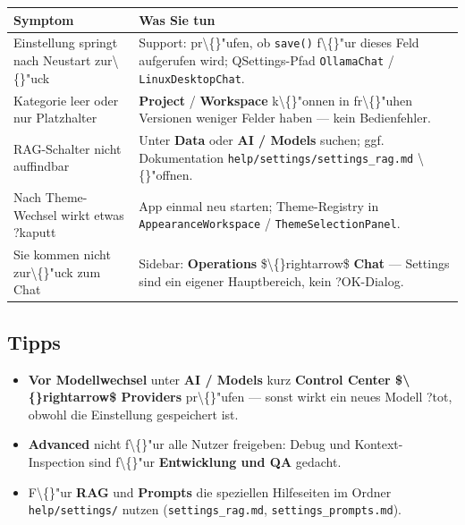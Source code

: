 \begin{center}
\begin{tabular}{ll}
\hline
Symptom & Was Sie tun \\
\hline
Einstellung springt nach Neustart zur\textbackslash\{\}"uck & Support: pr\textbackslash\{\}"ufen, ob \texttt{save()} f\textbackslash\{\}"ur dieses Feld aufgerufen wird; QSettings-Pfad \texttt{OllamaChat} / \texttt{LinuxDesktopChat}. \\
Kategorie leer oder nur Platzhalter & \textbf{Project} / \textbf{Workspace} k\textbackslash\{\}"onnen in fr\textbackslash\{\}"uhen Versionen weniger Felder haben --- kein Bedienfehler. \\
RAG-Schalter nicht auffindbar & Unter \textbf{Data} oder \textbf{AI / Models} suchen; ggf. Dokumentation \texttt{help/settings/settings\_rag.md} \textbackslash\{\}"offnen. \\
Nach Theme-Wechsel wirkt etwas ?kaputt\texttt{} & App einmal neu starten; Theme-Registry in \texttt{AppearanceWorkspace} / \texttt{ThemeSelectionPanel}. \\
Sie kommen nicht zur\textbackslash\{\}"uck zum Chat & Sidebar: \textbf{Operations} \$\textbackslash\{\}rightarrow\$ \textbf{Chat} --- Settings sind ein eigener Hauptbereich, kein ?OK\texttt{}-Dialog. \\
\hline
\end{tabular}
\end{center}

\subsection{Tipps}

\begin{itemize}
\item \textbf{Vor Modellwechsel} unter \textbf{AI / Models} kurz \textbf{Control Center \$\textbackslash\{\}rightarrow\$ Providers} pr\textbackslash\{\}"ufen --- sonst wirkt ein neues Modell ?tot\texttt{}, obwohl die Einstellung gespeichert ist.
\item \textbf{Advanced} nicht f\textbackslash\{\}"ur alle Nutzer freigeben: Debug und Kontext-Inspection sind f\textbackslash\{\}"ur \textbf{Entwicklung und QA} gedacht.
\item F\textbackslash\{\}"ur \textbf{RAG} und \textbf{Prompts} die speziellen Hilfeseiten im Ordner \texttt{help/settings/} nutzen (\texttt{settings\_rag.md}, \texttt{settings\_prompts.md}).
\end{itemize}
